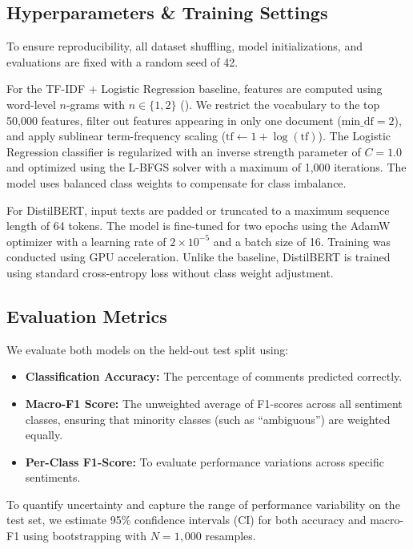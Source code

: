 \documentclass[
  conference,
  letterpaper]{IEEEtran}
\providecommand{\tightlist}{%
  \setlength{\itemsep}{0pt}\setlength{\parskip}{0pt}}
\begin{document}
\subsection{Hyperparameters \& Training
Settings}\label{hyperparameters-training-settings}

To ensure reproducibility, all dataset shuffling, model initializations,
and evaluations are fixed with a random seed of 42.

For the TF-IDF + Logistic Regression baseline, features are computed
using word-level \(n\)-grams with \(n \in \{1,2\}\)
(). We restrict the
vocabulary to the top 50,000 features, filter out features appearing in
only one document (\(\text{min\_df} = 2\)), and apply sublinear
term-frequency scaling (\(\text{tf} \leftarrow 1 + \log(\text{tf})\)).
The Logistic Regression classifier is regularized with an inverse
strength parameter of \(C = 1.0\) and optimized using the L-BFGS solver
with a maximum of 1,000 iterations. The model uses balanced class
weights to compensate for class imbalance.

For DistilBERT, input texts are padded or truncated to a maximum
sequence length of 64 tokens. The model is fine-tuned for two epochs
using the AdamW optimizer with a learning rate of \(2 \times 10^{-5}\)
and a batch size of 16. Training was conducted using GPU acceleration.
Unlike the baseline, DistilBERT is trained using standard cross-entropy
loss without class weight adjustment.

\subsection{Evaluation Metrics}\label{evaluation-metrics}

We evaluate both models on the held-out test split using:

\begin{itemize}
\tightlist
\item
  \textbf{Classification Accuracy:} The percentage of comments predicted
  correctly.
\item
  \textbf{Macro-F1 Score:} The unweighted average of F1-scores across
  all sentiment classes, ensuring that minority classes (such as
  ``ambiguous'') are weighted equally.
\item
  \textbf{Per-Class F1-Score:} To evaluate performance variations across
  specific sentiments.
\end{itemize}

To quantify uncertainty and capture the range of performance variability
on the test set, we estimate 95\% confidence intervals (CI) for both
accuracy and macro-F1 using bootstrapping with \(N = 1,000\) resamples.
\end{document}

